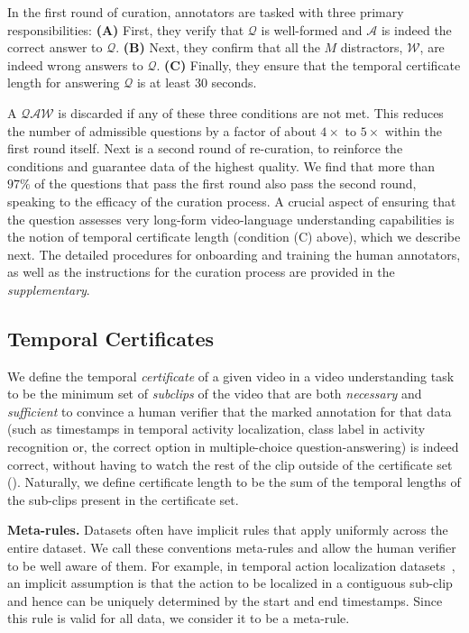 In the first round of curation, annotators are tasked with three primary responsibilities: \textbf{(A)} First, they verify that $\mathcal{Q}$ is well-formed and $\mathcal{A}$ is indeed the correct answer to $\mathcal{Q}$. \textbf{(B)} Next, they confirm that all the $M$ distractors, $\mathcal{W}$, are indeed wrong answers to $\mathcal{Q}$. \textbf{(C) }Finally, they ensure that the temporal certificate length for answering $\mathcal{Q}$ is at least 30 seconds. 

A $\mathcal{QAW}$ is discarded if any of these three conditions are not met. This reduces the number of admissible questions by a factor of about $4\times$ to $5\times$ within the first round itself. Next is a second round of re-curation, to reinforce the conditions and guarantee data of the highest quality. We find that more than $97\%$ of the questions that pass the first round also pass the second round, speaking to the efficacy of the curation process. A crucial aspect of ensuring that the question assesses very long-form video-language understanding capabilities is the notion of temporal certificate length (condition (C) above), which we describe next. The detailed procedures for onboarding and training the human annotators, as well as the instructions for the curation process are provided in the \textit{supplementary}.

\subsection{Temporal Certificates}
\label{sec:certificate_definition}

We define the temporal \textit{certificate} of a given video in a video understanding task to be the minimum set of \textit{subclips} of the video that are both \textit{necessary} and \textit{sufficient} to convince a human verifier that the marked annotation for that data (such as timestamps in temporal activity localization, class label in activity recognition or, the correct option in multiple-choice question-answering) is indeed correct, without having to watch the rest of the clip outside of the certificate set (). Naturally, we define certificate length to be the sum of the temporal lengths of the sub-clips present in the certificate set. 

\noindent \textbf{Meta-rules.} Datasets often have implicit rules that apply uniformly across the entire dataset. We call these conventions meta-rules and allow the human verifier to be well aware of them. For example, in temporal action localization datasets~\cite{thumos14}, an implicit assumption is that the action to be localized in a contiguous sub-clip and hence can be uniquely determined by the start and end timestamps. Since this rule is valid for all data, we consider it to be a meta-rule. 

